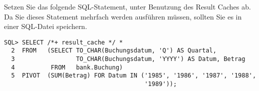     \item Setzen Sie das folgende SQL-Statement, unter Benutzung des Result
    Caches ab. Da Sie dieses Statement mehrfach werden ausf\"uhren m\"ussen,
    sollten Sie es in einer SQL-Datei speichern.
    \begin{lstlisting}[language=oracle_sql,alsolanguage=sqlplus]
SQL> SELECT /*+ result_cache */ *
  2  FROM   (SELECT TO_CHAR(Buchungsdatum, 'Q') AS Quartal,
  3                 TO_CHAR(Buchungsdatum, 'YYYY') AS Datum, Betrag
  4          FROM   bank.Buchung)
  5  PIVOT  (SUM(Betrag) FOR Datum IN ('1985', '1986', '1987', '1988', 
                                       '1989'));
    \end{lstlisting}
